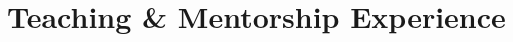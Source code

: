 \documentclass[10pt,letterpaper,sans]{moderncv}        %
\newcommand\x{1}
\newcommand\y{4}
\begin{document}




\newpage
\section{Teaching \& Mentorship Experience}

\vspace{\x pt}
\end{document}
